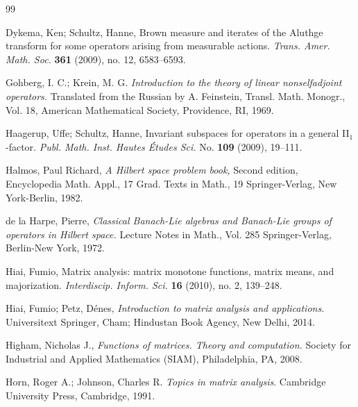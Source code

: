 \documentclass[12pt]{article}
\theoremstyle{definition}
\numberwithin{equation}{section}
\begin{document}
\begin{thebibliography}{99}




 Dykema, Ken; Schultz, Hanne, 
Brown measure and iterates of the Aluthge transform for some operators arising from measurable actions. 
\textit{Trans. Amer. Math. Soc.} \textbf{361} (2009), no. 12, 6583--6593.



 Gohberg, I. C.; Krein, M. G. 
\textit{Introduction to the theory of linear nonselfadjoint operators.} 
Translated from the Russian by A. Feinstein, 
Transl. Math. Monogr., Vol. 18, 
American Mathematical Society, Providence, RI, 1969. 

 Haagerup, Uffe; Schultz, Hanne, 
Invariant subspaces for operators in a general II$_1$-factor. 
\textit{Publ. Math. Inst. Hautes \'Etudes Sci.} No. \textbf{109} (2009), 19--111.

Halmos, Paul Richard, 
\textit{A Hilbert space problem book,} 
Second edition, Encyclopedia Math. Appl., 17
Grad. Texts in Math., 19
Springer-Verlag, New York-Berlin, 1982. 


 de la Harpe, Pierre, 
\textit{Classical Banach-Lie algebras and Banach-Lie groups of operators in Hilbert space.} 
Lecture Notes in Math., Vol. 285 Springer-Verlag, Berlin-New York, 1972.

 Hiai, Fumio, 
Matrix analysis: matrix monotone functions, matrix means, and majorization. 
\textit{Interdiscip. Inform. Sci.} \textbf{16} (2010), no. 2, 139--248.

 Hiai, Fumio; Petz, D\'enes, 
\textit{Introduction to matrix analysis and applications.} 
Universitext Springer, Cham; Hindustan Book Agency, New Delhi, 2014. 

Higham, Nicholas J., 
\textit{Functions of matrices.  
Theory and computation.}
Society for Industrial and Applied Mathematics (SIAM), Philadelphia, PA, 2008. 

Horn, Roger A.; Johnson, Charles R.
\textit{Topics in matrix analysis}.
Cambridge University Press, Cambridge, 1991. 


\end{thebibliography}
\end{document}
